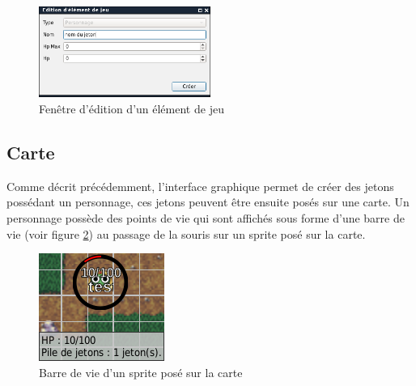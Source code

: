 \begin{figure}[h!]
	\centering
	\includegraphics[width=0.5\textwidth]{img/gameobject_edit.png}
	\caption{Fenêtre d'édition d'un élément de jeu}
	\label{fig:gameobject_edit}
\end{figure}
\newpage

\subsection{Carte}

Comme décrit précédemment, l'interface graphique permet de créer des jetons possédant un personnage, ces jetons peuvent être ensuite posés sur une carte. Un personnage possède des points de vie qui sont affichés sous forme d'une barre de vie (voir figure \ref{fig:lifebar}) au passage de la souris sur un sprite posé sur la carte.

\begin{figure}[h!]
	\centering
	\includegraphics[scale=0.9]{img/gameobject_lifebar.png}
	\caption{Barre de vie d'un sprite posé sur la carte}
    \label{fig:lifebar}
\end{figure}